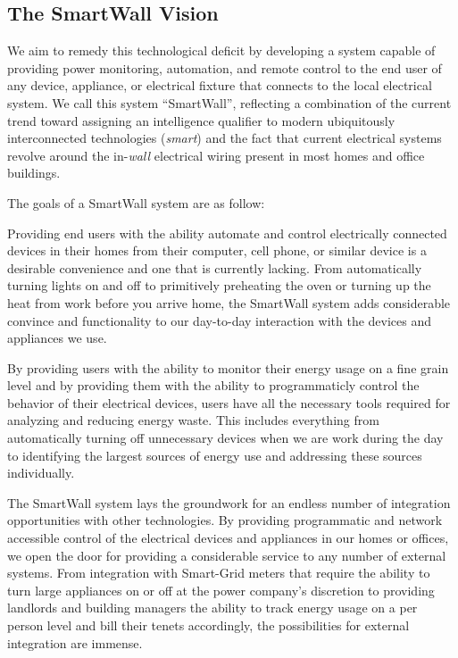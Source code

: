 \documentclass[12pt]{article}
\begin{document}
\subsection{The SmartWall Vision}
We aim to remedy this technological deficit
by developing a system capable of providing
power monitoring, automation, and remote control
to the end user of any device, appliance, or electrical fixture that
connects to the local electrical system. We call this system
``SmartWall'', reflecting a combination of the current trend
toward assigning an intelligence qualifier to modern ubiquitously
interconnected technologies (\emph{smart}) and the fact that
current electrical systems
revolve around the in-\emph{wall} electrical wiring present in most homes and
office buildings.

The goals of a SmartWall system are as follow:
\begin{description}
  \setlength{\itemsep}{0pt}
  \setlength{\parskip}{0pt}
  \setlength{\parsep}{0pt}
\item[Convenience:] Providing end users with the ability automate and
  control electrically connected devices in their homes from their
  computer, cell phone, or similar device is a desirable convenience
  and one that is currently lacking. From automatically turning lights
  on and off to primitively preheating the oven or turning up the heat
  from work before you arrive home, the SmartWall system adds
  considerable convince and functionality to our day-to-day
  interaction with the devices and appliances we use.
\item[Energy Conservation:] By providing users with the ability to
  monitor their energy usage on a fine grain level and by providing them
  with the ability to programmaticly control the behavior of their electrical
  devices, users have all the necessary tools required for analyzing
  and reducing energy waste. This includes everything from
  automatically turning off unnecessary devices when we are work
  during the day to identifying the largest sources of energy use and
  addressing these sources individually.
\item[Integration Framework:] The SmartWall system lays the groundwork for an
  endless number of integration opportunities with other
  technologies. By providing programmatic and network accessible
  control of the electrical devices and appliances in our homes or
  offices, we open the door for providing a considerable service to any
  number of external systems. From integration with Smart-Grid meters
  that require the ability to turn large appliances on or off at the
  power company's discretion to providing landlords and building
  managers the ability to track energy usage on a per person level and
  bill their tenets accordingly, the possibilities for external
  integration are immense.
\end{description}
\end{document}
